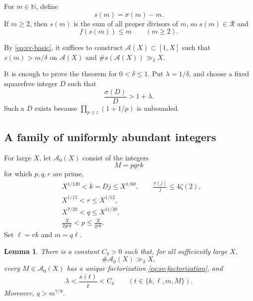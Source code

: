 \documentclass[11pt]{article}
\newtheorem{lemma}[theorem]{Lemma}
\theoremstyle{remark}
\newcommand{\N}{\mathbb N}
\newcommand{\Rcal}{\mathcal R}
\newcommand{\1}{\mathbf 1}
\begin{document}
For $m\in\N$, define
\[
 s(m)=\sigma(m)-m.
\]
If $m\geq2$, then $s(m)$ is the sum of all proper divisors of $m$, so
$s(m)\in\Rcal$ and
\begin{equation}\label{eq:sv-basic}
  f(s(m))\leq m \qquad(m\geq2).
\end{equation}


By \eqref{eq:sv-basic}, it suffices to construct $\mathcal A(X)\subset[1,X]$
such that $s(m)>m/\delta$ on $\mathcal A(X)$ and
$\#s(\mathcal A(X))\gg_\delta X$.

It is enough to prove the theorem for $0<\delta\leq1$.  Put
$\lambda=1/\delta$, and choose a fixed squarefree integer $D$ such that
\begin{equation}\label{eq:sv-D}
  \frac{\sigma(D)}D>1+\lambda.
\end{equation}
Such a $D$ exists because $\prod_{p\leq z}(1+1/p)$ is unbounded.

\subsection{A family of uniformly abundant integers}

For large $X$, let $\mathcal A_0(X)$ consist of the integers
\begin{equation}\label{eq:sv-factorization}
  M=pqrk
\end{equation}
for which $p,q,r$ are prime,
\begin{align*}
  &X^{1/120}<k=Dj\leq X^{1/60},
       \qquad \frac{\sigma(j)}j\leq4\zeta(2),\\
  &X^{1/15}<r\leq X^{1/12},\\
  &X^{7/20}<q\leq X^{11/30},\\
  &\frac{X}{2qrk}<p\leq\frac{X}{qrk}.
\end{align*}
Set $\ell=rk$ and $m=q\ell$.

\begin{lemma}\label{lem:sv-family}
There is a constant $C_\delta>0$ such that, for all sufficiently large
$X$,
\[
  \#\mathcal A_0(X)\gg_\delta X,
\]
every $M\in\mathcal A_0(X)$ has a unique factorization
\eqref{eq:sv-factorization}, and
\begin{equation}\label{eq:sv-two-sided}
  \lambda<\frac{s(t)}t<C_\delta
  \qquad(t\in\{k,\ell,m,M\}).
\end{equation}
Moreover, $q>m^{7/9}$.
\end{lemma}
\end{document}
